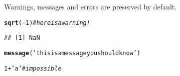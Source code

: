\documentclass{article}\usepackage[]{graphicx}\usepackage[]{color}
\makeatletter
\newcommand{\hlnum}[1]{\textcolor[rgb]{0.686,0.059,0.569}{#1}}%
\newcommand{\hlstr}[1]{\textcolor[rgb]{0.192,0.494,0.8}{#1}}%
\newcommand{\hlcom}[1]{\textcolor[rgb]{0.678,0.584,0.686}{\textit{#1}}}%
\newcommand{\hlopt}[1]{\textcolor[rgb]{0,0,0}{#1}}%
\newcommand{\hlstd}[1]{\textcolor[rgb]{0.345,0.345,0.345}{#1}}%
\newcommand{\hlkwd}[1]{\textcolor[rgb]{0.737,0.353,0.396}{\textbf{#1}}}%
\newenvironment{kframe}{%
 \def\at@end@of@kframe{}%
 \ifinner\ifhmode%
  \def\at@end@of@kframe{\end{minipage}}%
  \begin{minipage}{\columnwidth}%
 \fi\fi%
 \def\FrameCommand##1{\hskip\@totalleftmargin \hskip-\fboxsep
 \colorbox{shadecolor}{##1}\hskip-\fboxsep
     \hskip-\linewidth \hskip-\@totalleftmargin \hskip\columnwidth}%
 \MakeFramed {\advance\hsize-\width
   \@totalleftmargin\z@ \linewidth\hsize
   \@setminipage}}%
 {\par\unskip\endMakeFramed%
 \at@end@of@kframe}
\newenvironment{knitrout}{}{} %
\makeatother
\begin{document}
Warnings, messages and errors are preserved by default.
\begin{knitrout}
\color{fgcolor}\begin{kframe}
\begin{alltt}
 \hlkwd{sqrt}\hlstd{(}\hlopt{-}\hlnum{1}\hlstd{)} \hlcom{# here is a warning!}
\end{alltt}


{\ttfamily\noindent\color{warningcolor}{\#\# Warning in sqrt(-1): NaNs produced}}\begin{verbatim}
## [1] NaN
\end{verbatim}
\begin{alltt}
 \hlkwd{message}\hlstd{(}\hlstr{'this is a message you should know'}\hlstd{)}
\end{alltt}


{\ttfamily\noindent\itshape\color{messagecolor}{\#\# this is a message you should know}}\begin{alltt}
 \hlnum{1}\hlopt{+}\hlstr{'a'} \hlcom{# impossible}
\end{alltt}


{\ttfamily\noindent\bfseries{}}\end{kframe}
\end{knitrout}
\end{document}
